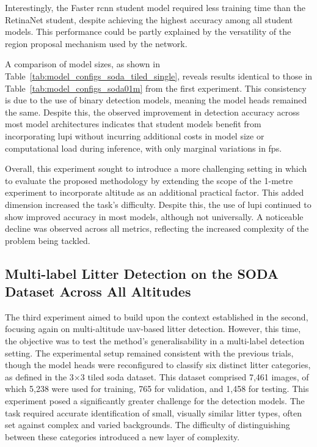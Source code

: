 Interestingly, the Faster \gls{rcnn} student model required less training time than the RetinaNet student, despite achieving the highest accuracy among all student models. This performance could be partly explained by the versatility of the region proposal mechanism used by the network.

A comparison of model sizes, as shown in Table~\ref{tab:model_configs_soda_tiled_single}, reveals results identical to those in Table~\ref{tab:model_configs_soda01m} from the first experiment. This consistency is due to the use of binary detection models, meaning the model heads remained the same. Despite this, the observed improvement in detection accuracy across most model architectures indicates that student models benefit from incorporating \gls{lupi} without incurring additional costs in model size or computational load during inference, with only marginal variations in \gls{fps}.

Overall, this experiment sought to introduce a more challenging setting in which to evaluate the proposed methodology by extending the scope of the 1-metre experiment to incorporate altitude as an additional practical factor. This added dimension increased the task's difficulty. Despite this, the use of \gls{lupi} continued to show improved accuracy in most models, although not universally. A noticeable decline was observed across all metrics, reflecting the increased complexity of the problem being tackled.


\subsection{Multi-label Litter Detection on the SODA Dataset Across All Altitudes}
\label{subsec:5_soda_tiled_multi_dataset_exp}

The third experiment aimed to build upon the context established in the second, focusing again on multi-altitude \gls{uav}-based litter detection. However, this time, the objective was to test the method’s generalisability in a multi-label detection setting. The experimental setup remained consistent with the previous trials, though the model heads were reconfigured to classify six distinct litter categories, as defined in the 3$\times$3 tiled \gls{soda} dataset. This dataset comprised 7,461 images, of which 5,238 were used for training, 765 for validation, and 1,458 for testing.
This experiment posed a significantly greater challenge for the detection models. The task required accurate identification of small, visually similar litter types, often set against complex and varied backgrounds. The difficulty of distinguishing between these categories introduced a new layer of complexity.

